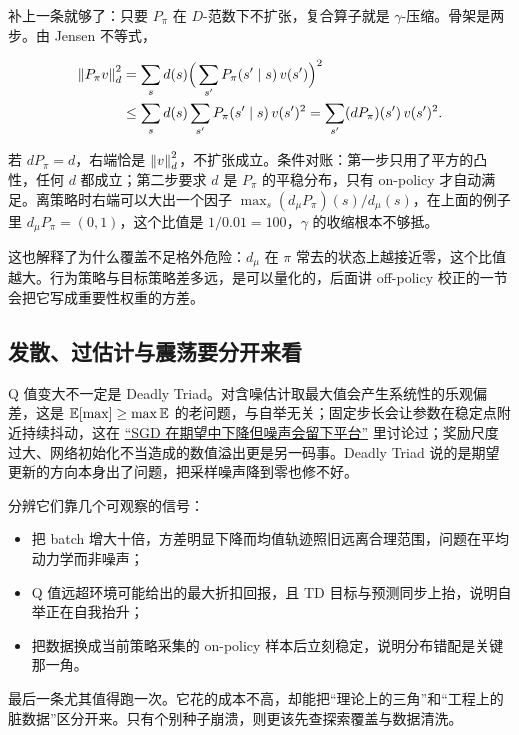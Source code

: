 补上一条就够了：只要 \(P_\pi\) 在 \(D\)-范数下不扩张，复合算子就是 \(\gamma\)-压缩。骨架是两步。由 Jensen 不等式，

\[
\begin{aligned}
\left\lVert P_\pi v\right\rVert_{d}^{2}
&=\sum_s d(s)\Big(\sum_{s'}P_\pi(s'\mid s)\,v(s')\Big)^{2}\\
&\le\sum_s d(s)\sum_{s'}P_\pi(s'\mid s)\,v(s')^{2}
=\sum_{s'}(dP_\pi)(s')\,v(s')^{2}.
\end{aligned}
\]

若 \(dP_\pi=d\)，右端恰是 \(\left\lVert v\right\rVert_d^{2}\)，不扩张成立。条件对账：第一步只用了平方的凸性，任何 \(d\) 都成立；第二步要求 \(d\) 是 \(P_\pi\) 的平稳分布，只有 on-policy 才自动满足。离策略时右端可以大出一个因子 \(\max_s (d_\mu P_\pi)(s)/d_\mu(s)\)，在上面的例子里 \(d_\mu P_\pi=(0,1)\)，这个比值是 \(1/0.01=100\)，\(\gamma\) 的收缩根本不够抵。

这也解释了为什么覆盖不足格外危险：\(d_\mu\) 在 \(\pi\) 常去的状态上越接近零，这个比值越大。行为策略与目标策略差多远，是可以量化的，后面讲 off-policy 校正的一节会把它写成重要性权重的方差。

\subsection{发散、过估计与震荡要分开来看}

Q 值变大不一定是 Deadly Triad。对含噪估计取最大值会产生系统性的乐观偏差，这是 \(\mathbb{E}[\max]\ge\max\mathbb{E}\) 的老问题，与自举无关；固定步长会让参数在稳定点附近持续抖动，这在 \hyperref[sec:09-Convex-Optimization/08-Nonconvex-and-Stochastic-Optimization/04]{``SGD 在期望中下降但噪声会留下平台''} 里讨论过；奖励尺度过大、网络初始化不当造成的数值溢出更是另一码事。Deadly Triad 说的是期望更新的方向本身出了问题，把采样噪声降到零也修不好。

分辨它们靠几个可观察的信号：

\begin{itemize}
\tightlist
\item 把 batch 增大十倍，方差明显下降而均值轨迹照旧远离合理范围，问题在平均动力学而非噪声；
\item Q 值远超环境可能给出的最大折扣回报，且 TD 目标与预测同步上抬，说明自举正在自我抬升；
\item 把数据换成当前策略采集的 on-policy 样本后立刻稳定，说明分布错配是关键那一角。
\end{itemize}

最后一条尤其值得跑一次。它花的成本不高，却能把``理论上的三角''和``工程上的脏数据''区分开来。只有个别种子崩溃，则更该先查探索覆盖与数据清洗。


